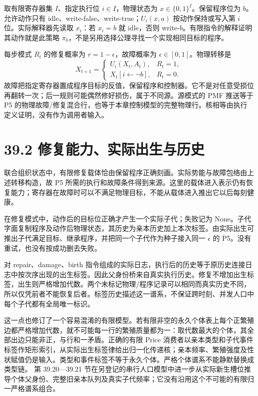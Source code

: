 \documentclass[
  11pt,
  oneside]{book}
\begin{document}
取有限寄存器集 \(I\)、指定执行位 \(i\in I\)，物理状态为 \(x\in\{0,1\}^I\)。保留程序位为 \(b\)。允许动作只有 idle、write-false、write-true；\(U_i(x,a)\) 按动作保持或写入第 \(i\) 位。实际解释器先读取 \(x_i\)：若 \(x_i=b\) 就 idle，否则 write-\(b\)。有限指令的解释证明其动作就是此策略 \(\pi_b\)，不是另用选择公理寻找一个实现相同目标的程序。

每步模式 \(R_t\) 的修复概率为 \(r=1-\epsilon\)，故障概率为 \(\epsilon\in[0,1]\)。物理转移是 \[X_{t+1}=\begin{cases}
U_i(X_t,A_t),&R_t=1,\\
X_t[i\leftarrow\neg b],&R_t=0.
\end{cases}\] 故障把指定寄存器置成程序目标的反值，保留程序和控制器。它不是对任意受损位再翻转一次；后一规则可能偶然修好损伤，属于不同源。源模式的 PMF 推送等于 P5 的物理故障/修复混合行，也等于本章控制模型的完整物理行。核相等由执行定义证明，没有作为调用者输入。

\section{39.2 修复能力、实际出生与历史}\label{ux4feeux590dux80fdux529bux5b9eux9645ux51faux751fux4e0eux5386ux53f2}

联合组织状态中，有限修复载体恰由保留程序正确刻画。实际势能与故障包络由上述转移构造，故 P5 所需的执行和故障条件得到来源。这里的载体进入表示仍有恢复能力；寄存器在故障时可以不满足物理目标，不能从载体进入推出它以后每刻健康。

在修复模式中，动作后的目标位正确才产生一个实际子代；失败记为 None。子代字面复制程序及动作后物理状态，其历史为亲本历史加上本次标签。由实际出生可推出子代满足目标、继承程序，并把同一个子代作为种子接入同一 \(\epsilon\) 的 P5。没有重试，也没有按成功删去失败。

对 repair、damage、birth 指令组成的实际日志，执行后的历史等于原历史连接日志中按次序出现的出生标签。因此父身份桥来自真实执行历史。修复不增加出生标签，出生则严格增加代数。两个未标记物理/程序记录可以相同而真实历史不同，所以仅凭前者不能恢复后者。标签历史描述这一谱系，不保证跨时刻、并发人口中每个子代都有全局唯一标识。

这一点也修订了一个容易混淆的有限模型。若有限非空的永久个体表上每个正繁殖边都严格增加代数，就不可能每一行的繁殖质量都为一：取代数最大的个体，其全部出边只能非正，与行和一矛盾。正确的有限 Price 消费者以亲本类型和子代事件标签作矩形索引，从实际出生标签律给出归一化传递核；亲本频率、繁殖强度及性状赋值仍是输入。类型和事件标签不等于永久个体。严格个体谱系不能静默替换成类型链。 第 39.20---39.21 节在另登记的串行人口模型中进一步从实际新生槽位推导个体父身份、完整旧亲本队列及真实子代频率；它没有沿用这个不可能的有限归一严格谱系组合。
\end{document}
